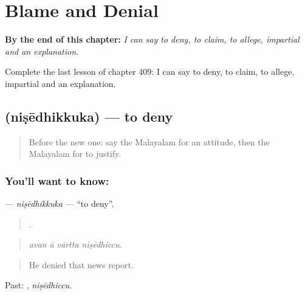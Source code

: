 
\chapter{Blame and Denial}
\label{ch:ml-blame-and-denial}

\begin{chapteropening}
\textbf{By the end of this chapter:} \emph{I can say to deny, to claim, to allege, impartial and an explanation.}

Complete the last lesson of chapter 409: I can say to deny, to claim, to allege, impartial and an explanation.
\end{chapteropening}

\section[\texorpdfstring{\ml{നിഷേധിക്കുക} (niṣēdhikkuka)}{നിഷേധിക്കുക (niṣēdhikkuka)}]{ (niṣēdhikkuka) — to deny}

\label{lesson:ML-C409-nisedhikkuka}



\begin{quote}
Before the new one: say the Malayalam for an attitude, then the Malayalam for to justify.
\end{quote}

\subsection*{You'll want to know: }
\textbf{} — \emph{niṣēdhikkuka} — \textquotedblleft{}to deny\textquotedblright{}.

\begin{quote}
   .
\end{quote}

\begin{quote}
\emph{avan ā vārtta niṣēdhiccu.}
\end{quote}

\begin{quote}
He denied that news report.
\end{quote}

Past: , \emph{niṣēdhiccu}.

